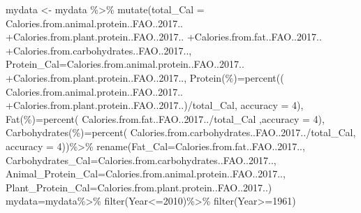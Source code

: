 \documentclass[11pt,a4paper,]{article}
\newenvironment{Shaded}{\begin{snugshade}}{\end{snugshade}}
\newcommand{\AttributeTok}[1]{\textcolor[rgb]{0.77,0.63,0.00}{#1}}
\newcommand{\DecValTok}[1]{\textcolor[rgb]{0.00,0.00,0.81}{#1}}
\newcommand{\FunctionTok}[1]{\textcolor[rgb]{0.00,0.00,0.00}{#1}}
\newcommand{\NormalTok}[1]{#1}
\newcommand{\OtherTok}[1]{\textcolor[rgb]{0.56,0.35,0.01}{#1}}
\newcommand{\SpecialCharTok}[1]{\textcolor[rgb]{0.00,0.00,0.00}{#1}}
\newcommand{\StringTok}[1]{\textcolor[rgb]{0.31,0.60,0.02}{#1}}
\begin{document}
\begin{Shaded}
\begin{Highlighting}[]
\NormalTok{mydata }\OtherTok{\textless{}{-}}\NormalTok{ mydata }\SpecialCharTok{\%\textgreater{}\%} 
  \FunctionTok{mutate}\NormalTok{(}\AttributeTok{total\_Cal =}\NormalTok{ Calories.from.animal.protein..FAO..}\DecValTok{2017}\NormalTok{..}
         \SpecialCharTok{+}\NormalTok{Calories.from.plant.protein..FAO..}\DecValTok{2017}\NormalTok{..}
         \SpecialCharTok{+}\NormalTok{Calories.from.fat..FAO..}\DecValTok{2017}\NormalTok{..}
         \SpecialCharTok{+}\NormalTok{Calories.from.carbohydrates..FAO..}\DecValTok{2017}\NormalTok{..,}
         \AttributeTok{Protein\_Cal=}\NormalTok{Calories.from.animal.protein..FAO..}\DecValTok{2017}\NormalTok{..}
         \SpecialCharTok{+}\NormalTok{Calories.from.plant.protein..FAO..}\DecValTok{2017}\NormalTok{..,}
         \StringTok{\textasciigrave{}}\AttributeTok{Protein(\%)}\StringTok{\textasciigrave{}}\OtherTok{=}\FunctionTok{percent}\NormalTok{((}
\NormalTok{           Calories.from.animal.protein..FAO..}\DecValTok{2017}\NormalTok{..}
           \SpecialCharTok{+}\NormalTok{Calories.from.plant.protein..FAO..}\DecValTok{2017}\NormalTok{..)}\SpecialCharTok{/}\NormalTok{total\_Cal,}
           \AttributeTok{accuracy =} \DecValTok{4}\NormalTok{),}
         \StringTok{\textasciigrave{}}\AttributeTok{Fat(\%)}\StringTok{\textasciigrave{}}\OtherTok{=}\FunctionTok{percent}\NormalTok{(}
\NormalTok{           Calories.from.fat..FAO..}\DecValTok{2017}\NormalTok{..}\SpecialCharTok{/}\NormalTok{total\_Cal}
\NormalTok{           ,}\AttributeTok{accuracy =} \DecValTok{4}\NormalTok{),}
         \StringTok{\textasciigrave{}}\AttributeTok{Carbohydrates(\%)}\StringTok{\textasciigrave{}}\OtherTok{=}\FunctionTok{percent}\NormalTok{(}
\NormalTok{           Calories.from.carbohydrates..FAO..}\DecValTok{2017}\NormalTok{..}\SpecialCharTok{/}\NormalTok{total\_Cal,}
           \AttributeTok{accuracy =} \DecValTok{4}\NormalTok{))}\SpecialCharTok{\%\textgreater{}\%}
  \FunctionTok{rename}\NormalTok{(}\AttributeTok{Fat\_Cal=}\NormalTok{Calories.from.fat..FAO..}\DecValTok{2017}\NormalTok{..,}
         \AttributeTok{Carbohydrates\_Cal=}\NormalTok{Calories.from.carbohydrates..FAO..}\DecValTok{2017}\NormalTok{..,}
         \AttributeTok{Animal\_Protein\_Cal=}\NormalTok{Calories.from.animal.protein..FAO..}\DecValTok{2017}\NormalTok{..,}
         \AttributeTok{Plant\_Protein\_Cal=}\NormalTok{Calories.from.plant.protein..FAO..}\DecValTok{2017}\NormalTok{..)}
\NormalTok{mydata}\OtherTok{=}\NormalTok{mydata}\SpecialCharTok{\%\textgreater{}\%}
  \FunctionTok{filter}\NormalTok{(Year}\SpecialCharTok{\textless{}=}\DecValTok{2010}\NormalTok{)}\SpecialCharTok{\%\textgreater{}\%}
  \FunctionTok{filter}\NormalTok{(Year}\SpecialCharTok{\textgreater{}=}\DecValTok{1961}\NormalTok{)}


\end{Highlighting}
\end{Shaded}
\end{document}
